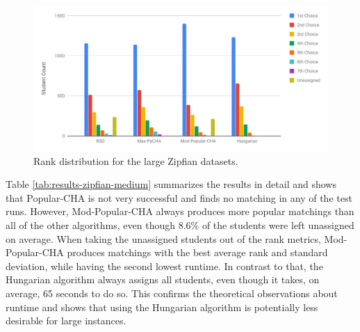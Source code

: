\begin{figure}[h!]
  \centering
    \includegraphics[width=0.8\linewidth]{assets/plots/zipfian-medium.pdf}
    \caption{Rank distribution for the large Zipfian datasets.}
    \label{fig:zipfian-medium-distribution}
\end{figure}

\begin{table}[h!]
  \centering
  \caption{Average results for the large Zipfian dataset (2500 Students) with 10 runs}
  \label{tab:results-zipfian-medium}
\end{table}

Table \ref{tab:results-zipfian-medium} summarizes the results in detail and shows that Popular-CHA is not very successful and finds no matching in any of the test runs. However, Mod-Popular-CHA always produces more popular matchings than all of the other algorithms, even though 8.6\% of the students were left unassigned on average. When taking the unassigned students out of the rank metrics, Mod-Popular-CHA produces matchings with the best average rank and standard deviation, while having the second lowest runtime. In contrast to that, the Hungarian algorithm always assigns all students, even though it takes, on average, 65 seconds to do so. This confirms the theoretical observations about runtime and shows that using the Hungarian algorithm is potentially less desirable for large instances.

